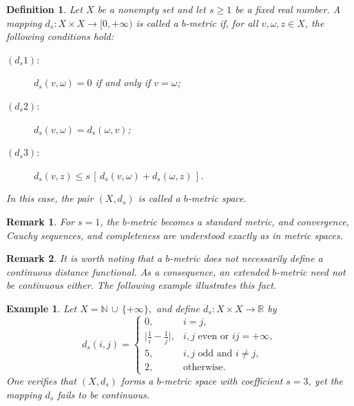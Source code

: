 \documentclass[sn-mathphys-num]{sn-jnl}%
\theoremstyle{thmstyleone}%
\theoremstyle{thmstyletwo}%
\newtheorem{example}{Example}%
\newtheorem{remark}{Remark}%
\theoremstyle{thmstylethree}%
\newtheorem{definition}{Definition}
\numberwithin{equation}{section}
\begin{document}
\begin{definition}Let $X$ be a nonempty set and let $s \ge 1$ be a fixed real number. 
A mapping $d_{s} : X \times X \to [0,+\infty)$ is called a \emph{$b$-metric} 
if, for all $v,\omega,z \in X$, the following conditions hold:

\begin{description}
    \item[$(d_{s}1)$:] $d_{s}(v,\omega)=0$ if and only if $v=\omega$;
    \item[$(d_{s}2)$:] $d_{s}(v,\omega)=d_{s}(\omega,v)$;
    \item[$(d_{s}3)$:] $d_{s}(v,z) \le s\,[\,d_{s}(v,\omega)+d_{s}(\omega,z)\,]$.
\end{description}
In this case, the pair $(X,d_{s})$ is called a \emph{$b$-metric space}.
\end{definition}
\vspace{0.2cm}
\begin{remark}
For $s = 1$, the $b$-metric becomes a standard metric, and convergence, Cauchy sequences, and completeness are understood exactly as in metric spaces.
\end{remark}
\vspace{0.2cm}
\begin{remark}
It is worth noting that a $b$-metric does not necessarily define a continuous 
distance functional. As a consequence, an extended $b$-metric need not be 
continuous either. The following example illustrates this fact.
\end{remark}
\vspace{0.2cm}
\begin{example}\cite{Nawab}
Let $X=\mathbb{N}\,\cup\,\{+\infty\},$
and define $d_{s} : X\times X \to \mathbb{R}$ by
\[
d_{s}(i,j)=
\begin{cases}
0, & i=j,\\[2mm]
\bigl|\tfrac{1}{i}-\tfrac{1}{j}\bigr|, & i,j \text{ even or } ij=+\infty,\\[2mm]
5, & i,j \text{ odd and } i\neq j,\\[2mm]
2, & \text{otherwise}.
\end{cases}
\]
One verifies that $(X,d_{s})$ forms a $b$-metric space with coefficient $s=3$, 
yet the mapping $d_{s}$ fails to be continuous.
\end{example}
\vspace{0.2cm}
\end{document}
